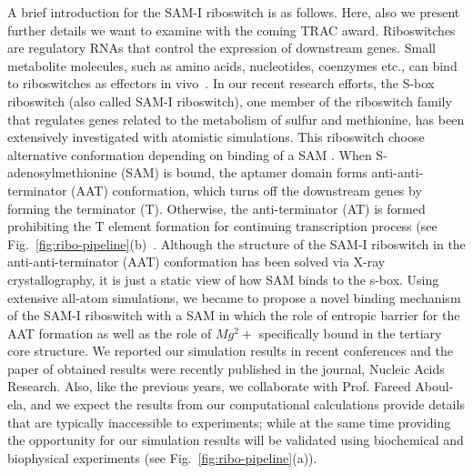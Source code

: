 \documentclass[a4paper,10pt]{article}
\begin{document}
A brief introduction for the SAM-I riboswitch is as follows.  Here, also we present further details we want to examine with the coming TRAC award.  Riboswitches are regulatory RNAs that control the expression of downstream genes. Small metabolite molecules, such as amino acids, nucleotides, coenzymes etc., can bind to riboswitches as effectors in vivo~\cite{mandal}.  In our recent research efforts, the S-box riboswitch (also called SAM-I riboswitch), one member of the riboswitch family that regulates genes related to the metabolism of sulfur and methionine, has been extensively investigated with atomistic simulations.  This riboswitch choose alternative conformation depending on binding of a SAM .  When S-adenosylmethionine (SAM) is bound, the aptamer domain forms anti-anti-terminator (AAT) conformation, which turns off the downstream genes by forming the terminator (T). Otherwise, the anti-terminator (AT) is formed prohibiting the T element formation for continuing transcription process (see Fig.~\ref{fig:ribo-pipeline}(b)~\cite{brooke}.  Although the structure of the SAM-I riboswitch in the anti-anti-terminator (AAT) conformation has been solved via X-ray crystallography, it is just a static view of how SAM binds to the s-box.  Using extensive all-atom simulations, we became to propose a novel binding mechanism of the SAM-I riboswitch with a SAM in which the role of entropic barrier for the AAT formation as well as the role of $Mg^2+$ specifically bound in the tertiary core structure.  We reported our simulation results in recent conferences and the paper of obtained results were recently published in the journal, Nucleic Acids Research\cite{SAM-I-NAR2009}.  Also, like the previous years, we collaborate with Prof. Fareed Aboul-ela, and we expect the results from our computational calculations provide details that are typically inaccessible to experiments; while at the same time providing the opportunity for our simulation results will be validated using biochemical and biophysical experiments (see Fig.~\ref{fig:ribo-pipeline}(a)).
\end{document}
